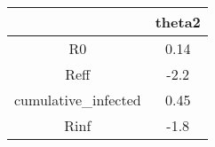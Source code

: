 \begin{tabular}{|c|c|}
\hline
& theta2 \\
\hline
R0 & 0.14 \\
\hline
Reff & -2.2 \\
\hline
cumulative_infected & 0.45 \\
\hline
Rinf & -1.8 \\
\hline
\end{tabular}

